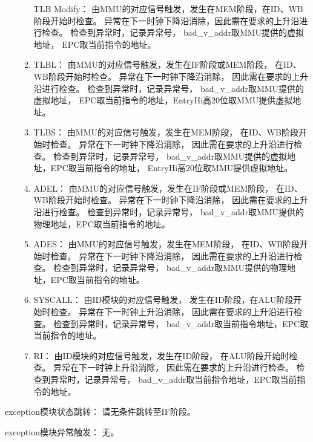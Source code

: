 \begin{enumerate}
\begin{enumerate}
                    TLB Modify：
                        由MMU的对应信号触发，发生在MEM阶段，在ID、WB阶段开始时检查。
                        异常在下一时钟下降沿消除，因此需在要求的上升沿进行检查。
                        检查到异常时，记录异常号，%
                        bad\_v\_addr取MMU提供的虚拟地址，%
                        EPC取当前指令的地址。
                    \item
                    TLBL：
                        由MMU的对应信号触发，发生在IF阶段或MEM阶段，%
                        在ID、WB阶段开始时检查。%
                        异常在下一时钟下降沿消除，%
                        因此需在要求的上升沿进行检查。%
                        检查到异常时，记录异常号，%
                        bad\_v\_addr取MMU提供的虚拟地址，%
                        EPC取当前指令的地址，EntryHi高20位取MMU提供虚拟地址。
                    \item
                    TLBS：
                        由MMU的对应信号触发，发生在MEM阶段，%
                        在ID、WB阶段开始时检查。
                        异常在下一时钟下降沿消除，%
                        因此需在要求的上升沿进行检查。%
                        检查到异常时，记录异常号，%
                        bad\_v\_addr取MMU提供的虚拟地址，EPC取当前指令的地址，%
                        EntryHi高20位取MMU提供虚拟地址。
                    \item
                    ADEL：
                        由MMU的对应信号触发，发生在IF阶段或MEM阶段，%
                        在ID、WB阶段开始时检查。%
                        异常在下一时钟下降沿消除，%
                        因此需在要求的上升沿进行检查。%
                        检查到异常时，记录异常号，%
                        bad\_v\_addr取MMU提供的物理地址，EPC取当前指令的地址。
                    \item
                    ADES：
                        由MMU的对应信号触发，发生在MEM阶段，%
                        在ID、WB阶段开始时检查。%
                        异常在下一时钟下降沿消除，%
                        因此需在要求的上升沿进行检查。%
                        检查到异常时，记录异常号，%
                        bad\_v\_addr取MMU提供的物理地址，EPC取当前指令的地址。
                    \item
                    SYSCALL：
                        由ID模块的对应信号触发，%
                        发生在ID阶段，在ALU阶段开始时检查。%
                        异常在下一时钟上升沿消除，%
                        因此需在要求的上升沿进行检查。%
                        检查到异常时，记录异常号，%
                        bad\_v\_addr取当前指令地址，EPC取当前指令的地址。
                    \item
                    RI：
                        由ID模块的对应信号触发，发生在ID阶段，%
                        在ALU阶段开始时检查。%
                        异常在下一时钟上升沿消除，%
                        因此需在要求的上升沿进行检查。%
                        检查到异常时，记录异常号，%
                        bad\_v\_addr取当前指令地址，EPC取当前指令的地址。
                \end{enumerate}
                \end{enumerate}

                exception模块状态跳转：
                    请无条件跳转至IF阶段。

                exception模块异常触发：
                    无。

